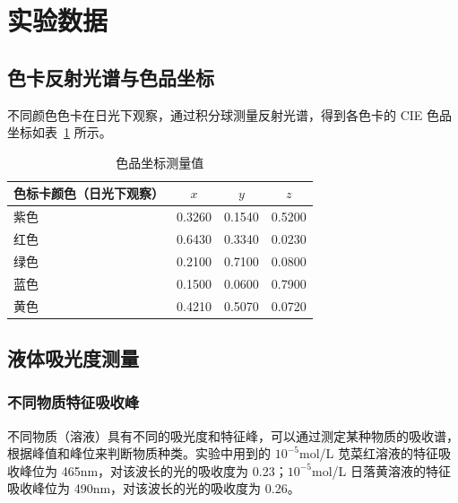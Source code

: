 \section{实验数据}

\subsection{色卡反射光谱与色品坐标}


不同颜色色卡在日光下观察，通过积分球测量反射光谱，得到各色卡的 CIE 色品坐标如表~\ref{tab:colorcoord} 所示。

\begin{table}[htbp]
    \centering
    \caption{色品坐标测量值}
    \label{tab:colorcoord}
    \begin{tabular}{lccc}
        \toprule
        色标卡颜色（日光下观察） & $x$ & $y$ & $z$ \\
        \midrule
        紫色 & 0.3260 & 0.1540 & 0.5200 \\
        红色 & 0.6430 & 0.3340 & 0.0230 \\
        绿色 & 0.2100 & 0.7100 & 0.0800 \\
        蓝色 & 0.1500 & 0.0600 & 0.7900 \\
        黄色 & 0.4210 & 0.5070 & 0.0720 \\
        \bottomrule
    \end{tabular}
\end{table}

\subsection{液体吸光度测量}


\subsubsection{不同物质特征吸收峰}

不同物质（溶液）具有不同的吸光度和特征峰，可以通过测定某种物质的吸收谱，根据峰值和峰位来判断物质种类。实验中用到的 $10^{-5}$mol/L 苋菜红溶液的特征吸收峰位为 465nm，对该波长的光的吸收度为 0.23；$10^{-5}$mol/L 日落黄溶液的特征吸收峰位为 490nm，对该波长的光的吸收度为 0.26。

